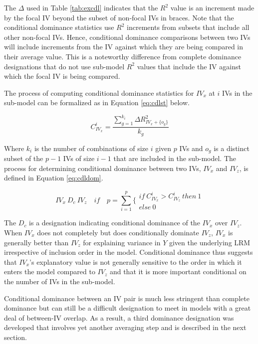 \documentclass[man]{apa7}
\begin{document}
	The $\Delta$ used in Table \ref{tab:excdl} indicates that the $R^2$ value is an increment made by the focal IV beyond the subset of non-focal IVs in braces.
	Note that the conditional dominance statistics use $R^2$ increments from subsets that include all other non-focal IVs.
	Hence, conditional dominance comparisons between two IVs will include increments from the IV against which they are being compared in their average value.
	This is a noteworthy difference from complete dominance designations that do not use sub-model $R^2$ values that include the IV against which the focal IV is being compared.
	
	The process of computing conditional dominance statistics for $IV_x$ at $i$ IVs in the sub-model can be formalized as in Equation \ref{eq:cdlst} below.
	
	\begin{equation}
		C^{i}_{IV_x} = \frac{\sum^{k_i}_{g=1} \Delta R^2_{IV_x + \{o_g\}}}{k_g}
		\label{eq:cdlst}
	\end{equation}
	
	Where $k_i$ is the number of combinations of size $i$ given $p$ IVs and $o_g$ is a distinct subset of the $p-1$ IVs of size $i - 1$ that are included in the sub-model.	
	The process for determining conditional dominance between two IVs, $IV_x$ and $IV_z$, is defined in Equation \ref{eq:cdldom}.
	
	\begin{equation}
		IV_x \ D_c \ IV_z \quad if \quad p = \sum^p_{i=1} \Biggl\{ 
		\begin{array}{l}
			if \ C^{i}_{IV_x} > C^{i}_{IV_z} \ then \ 1 \\ 
			else \ 0 
		\end{array}
		\label{eq:cdldom}
	\end{equation}
	
	The $D_c$ is a designation indicating conditional dominance of the $IV_x$ over $IV_z$.	
	When $IV_x$ does not completely but does conditionally dominate $IV_z$, $IV_x$ is generally better than $IV_z$ for explaining variance in $Y$ given the underlying LRM irrespective of inclusion order in the model.
	Conditional dominance thus suggests that $IV_x$'s explanatory value is not generally sensitive to the order in which it enters the model compared to $IV_z$ and that it is more important conditional on the number of IVs in the sub-model.
	
	Conditional dominance between an IV pair is much less stringent than complete dominance but can still be a difficult designation to meet in models with a great deal of between-IV overlap.
	As a result, a third dominance designation was developed that involves yet another averaging step and is described in the next section.
	
\end{document}

